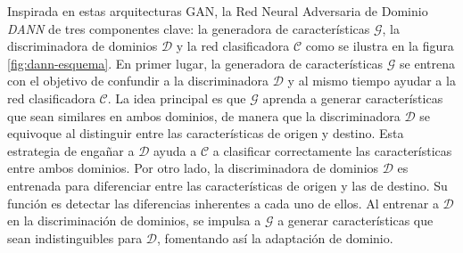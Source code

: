 Inspirada en estas arquitecturas GAN, la Red Neural Adversaria de Dominio {\it DANN} \parencite{ganin2016domain} de tres componentes clave: la generadora de características $\mathcal{G}$, la discriminadora de
dominios $\mathcal{D}$ y la red clasificadora $\mathcal{C}$ como se ilustra en la figura \ref{fig:dann-esquema}. En
primer lugar, la generadora de características $\mathcal{G}$ se entrena con el objetivo de confundir a la
discriminadora $\mathcal{D}$ y al mismo tiempo ayudar a la red clasificadora $\mathcal{C}$. La idea principal es que
$\mathcal{G}$ aprenda a generar características que sean similares en ambos dominios, de manera que la discriminadora
$\mathcal{D}$ se equivoque al distinguir entre las características de origen y destino. Esta estrategia de engañar a
$\mathcal{D}$ ayuda a $\mathcal{C}$ a clasificar correctamente las características entre ambos dominios. Por otro lado,
la discriminadora de dominios $\mathcal{D}$ es entrenada para diferenciar entre las características de origen y las de
destino. Su función es detectar las diferencias inherentes a cada uno de ellos. Al entrenar a $\mathcal{D}$ en la
discriminación de dominios, se impulsa a $\mathcal{G}$ a generar características que sean indistinguibles para
$\mathcal{D}$, fomentando así la adaptación de dominio.

